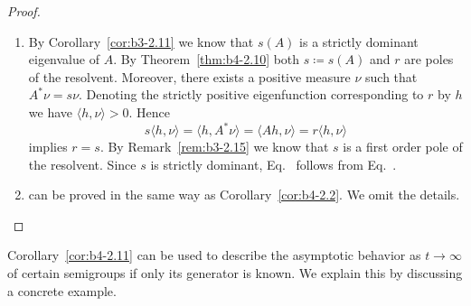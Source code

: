\begin{proof}
	\begin{enumerate}[\upshape (i), wide, labelindent=.25em]
		\item 
		By Corollary~\ref{cor:b3-2.11} we know that $s(A)$ is a strictly dominant eigenvalue of\/ $A$. 
        By Theorem~\ref{thm:b4-2.10} both $s  \coloneq  s(A)$ and $r$ are poles of the resolvent. 
        Moreover, there exists a positive measure $\nu$ such that $A^*\nu = s\nu$. 
        Denoting the strictly positive eigenfunction corresponding to $r$ by $h$ we have $\langle h,\nu \rangle > 0$. 
        Hence 
%
\[
	s\langle h,\nu \rangle = \langle h,A^*\nu \rangle = \langle Ah,\nu \rangle = r\langle h,\nu \rangle
\]
%
implies $r = s$. 
By Remark~\ref{rem:b3-2.15} we know that $s$ is a first order pole of the resolvent. Since $s$ is strictly dominant, Eq.~ follows from Eq.~.

\item 
can be proved in the same way as Corollary~\ref{cor:b4-2.2}. 
We omit the details.
\qedhere
	\end{enumerate}
\end{proof}
Corollary~\ref{cor:b4-2.11} can be used to describe the asymptotic behavior as $t \to \infty$ of certain semigroups if only its generator is known. 
We explain this by discussing a concrete example.
